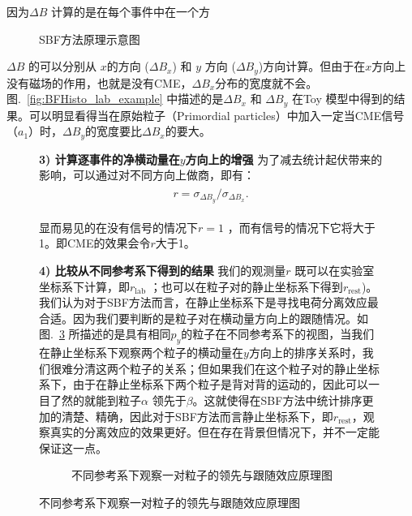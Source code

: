 因为$\Delta B$ 计算的是在每个事件中在一个方


\begin{figure}[htbp]
\centering
{}
\caption{SBF方法原理示意图 ~\cite{Tang2019} }
\label{fig:BF_cartoon}
\end{figure}


$\Delta B$ 的可以分别从 $x$的方向 ($\Delta B_{x}$) 和 $y$ 方向 ($\Delta B_{y}$)方向计算。但由于在$x$方向上没有磁场的作用，也就是没有CME，$\Delta B_{x}$分布的宽度就不会。图.~\ref{fig:BFHisto_lab_example} 中描述的是$\Delta B_{x}$ 和 $\Delta B_{y}$ 在Toy 模型中得到的结果。可以明显看得当在原始粒子（Primordial particles）中加入一定当CME信号（$a_1$）时，$\Delta B_y$的宽度要比$\Delta B_x$的要大。

\begin{figure}[htbp]



\textbf{3) 计算逐事件的净横动量在$y$方向上的增强} 为了减去统计起伏带来的影响，可以通过对不同方向上做商，即有：
\begin{eqnarray}
\begin{aligned}
r= \sigma_{\Delta B_y} / \sigma_{\Delta B_{x}}.
\end{aligned}
\label{eq:r}
\end{eqnarray}

显而易见的在没有信号的情况下$r=1$ ，而有信号的情况下它将大于1。即CME的效果会令$r$大于1。



\textbf{4) 比较从不同参考系下得到的结果 } 我们的观测量$r$ 既可以在实验室坐标系下计算，即$r_{\mathrm{lab}}$ ；也可以在粒子对的静止坐标系下得到$r_{\mathrm{rest}}$)。我们认为对于SBF方法而言，在静止坐标系下是寻找电荷分离效应最合适。因为我们要判断的是粒子对在横动量方向上的跟随情况。如图.~\ref{fig:boost_cartoon} 所描述的是具有相同$p_y$的粒子在不同参考系下的视图，当我们在静止坐标系下观察两个粒子的横动量在$y$方向上的排序关系时，我们很难分清这两个粒子的关系；但如果我们在这个粒子对的静止坐标系下，由于在静止坐标系下两个粒子是背对背的运动的，因此可以一目了然的就能到粒子$\alpha$ 领先于$\beta$。这就使得在SBF方法中统计排序更加的清楚、精确，因此对于SBF方法而言静止坐标系下，即$r_{\mathrm{rest}}$，观察真实的分离效应的效果更好。但在存在背景但情况下，并不一定能保证这一点。
\begin{figure}[htbp]
\centering
{}
\caption{不同参考系下观察一对粒子的领先与跟随效应原理图~\cite{Tang2019}}
\label{fig:boost_cartoon}
\end{figure}


\end{figure}
